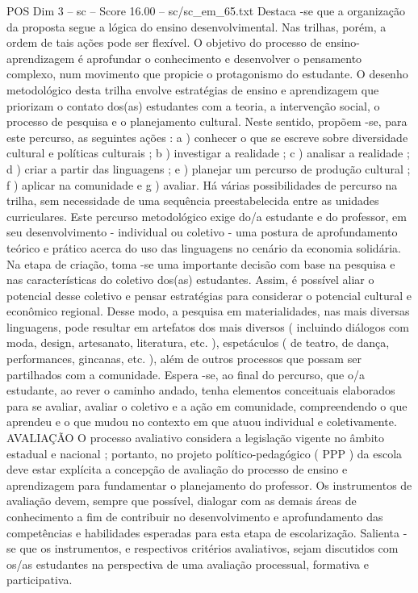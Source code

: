 \begin{textsample}{POS Dim 3 – sc – Score 16.00 – sc/sc\_em\_65.txt}
Destaca -se que a organização da proposta segue a lógica do ensino desenvolvimental.
Nas trilhas, porém, a ordem de tais ações pode ser flexível.
O objetivo do processo de ensino-aprendizagem é aprofundar o conhecimento e desenvolver o pensamento complexo, num movimento que propicie o protagonismo do estudante.
O desenho metodológico desta trilha envolve estratégias de ensino e aprendizagem que priorizam o contato dos(as) estudantes com a teoria, a intervenção social, o processo de pesquisa e o planejamento cultural.
Neste sentido, propõem -se, para este percurso, as seguintes ações : a ) conhecer o que se escreve sobre diversidade cultural e políticas culturais ; b ) investigar a realidade ; c ) analisar a realidade ; d ) criar a partir das linguagens ; e ) planejar um percurso de produção cultural ; f ) aplicar na comunidade e g ) avaliar.
Há várias possibilidades de percurso na trilha, sem necessidade de uma sequência preestabelecida entre as unidades curriculares.
Este percurso metodológico exige do/a estudante e do professor, em seu desenvolvimento - individual ou coletivo - uma postura de aprofundamento teórico e prático acerca do uso das linguagens no cenário da economia solidária.
Na etapa de criação, toma -se uma importante decisão com base na pesquisa e nas características do coletivo dos(as) estudantes.
Assim, é possível aliar o potencial desse coletivo e pensar estratégias para considerar o potencial cultural e econômico regional.
Desse modo, a pesquisa em materialidades, nas mais diversas linguagens, pode resultar em artefatos dos mais diversos ( incluindo diálogos com moda, design, artesanato, literatura, etc. ), espetáculos ( de teatro, de dança, performances, gincanas, etc. ), além de outros processos que possam ser partilhados com a comunidade.
Espera -se, ao final do percurso, que o/a estudante, ao rever o caminho andado, tenha elementos conceituais elaborados para se avaliar, avaliar o coletivo e a ação em comunidade, compreendendo o que aprendeu e o que mudou no contexto em que atuou individual e coletivamente.
AVALIAÇÃO O processo avaliativo considera a legislação vigente no âmbito estadual e nacional ; portanto, no projeto político-pedagógico ( PPP ) da escola deve estar explícita a concepção de avaliação do processo de ensino e aprendizagem para fundamentar o planejamento do professor.
Os instrumentos de avaliação devem, sempre que possível, dialogar com as demais áreas de conhecimento a fim de contribuir no desenvolvimento e aprofundamento das competências e habilidades esperadas para esta etapa de escolarização.
Salienta -se que os instrumentos, e respectivos critérios avaliativos, sejam discutidos com os/as estudantes na perspectiva de uma avaliação processual, formativa e participativa.

\end{textsample}
